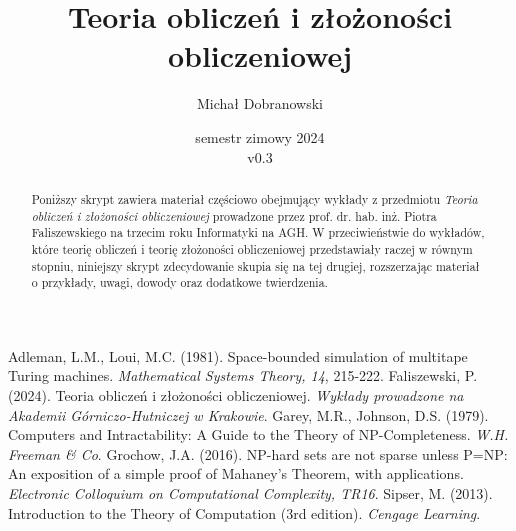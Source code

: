 \documentclass[pretty,polish,bibliography=totocnumbered]{angav}
\title{Teoria obliczeń i złożoności obliczeniowej}
\author{Michał Dobranowski}
\date{semestr zimowy 2024 \\ v0.3}
\begin{document}
    \maketitle
    \begin{abstract}
        \noindent Poniższy skrypt zawiera materiał częściowo obejmujący wykłady z przedmiotu \textit{Teoria obliczeń i złożoności obliczeniowej} prowadzone przez prof. dr. hab. inż. Piotra Faliszewskiego na trzecim roku Informatyki na AGH. W przeciwieństwie do wykładów, które teorię obliczeń i teorię złożoności obliczeniowej przedstawiały raczej w równym stopniu, niniejszy skrypt zdecydowanie skupia się na tej drugiej, rozszerzając materiał o przykłady, uwagi, dowody oraz dodatkowe twierdzenia.
    \end{abstract}
    \vspace*{\fill}
    {\footnotesize\doclicenseThis}
    \newpage

    \tableofcontents
    \newpage

    \SetVertexStyle[FillColor=gray, FillOpacity=0.4]
    \SetEdgeStyle[Color=black, LineWidth=0.8pt]

    
    

    \begin{thebibliography}{9}
         Adleman, L.M., Loui, M.C. (1981). Space-bounded simulation of multitape Turing machines. \textit{Mathematical Systems Theory, 14}, 215-222.
         Faliszewski, P. (2024). Teoria obliczeń i złożoności obliczeniowej. \textit{Wykłady prowadzone na Akademii Górniczo-Hutniczej w Krakowie}.
         Garey, M.R., Johnson, D.S. (1979). Computers and Intractability: A Guide to the Theory of NP-Completeness. \textit{W.H. Freeman \& Co}.
         Grochow, J.A. (2016). NP-hard sets are not sparse unless P=NP: An exposition of a simple proof of Mahaney's Theorem, with applications. \textit{Electronic Colloquium on Computational Complexity, TR16}.
         Sipser, M. (2013). Introduction to the Theory of Computation (3rd edition). \textit{Cengage Learning}.
    \end{thebibliography}

    
\end{document}
